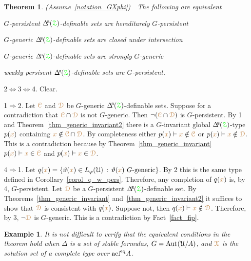 \documentclass[10pt,openany]{amsproc}
\makeatletter
\newcommand{\mylabel}[1]{{\ssf{#1}}\hfill}
\renewenvironment{itemize}
  {\begin{list}{}{%
   \setlength{\parskip}{0mm}
   \setlength{\topsep}{.2\baselineskip}
   \setlength{\rightmargin}{0mm}
   \setlength{\listparindent}{0mm}
   \setlength{\itemindent}{0mm}
   \setlength{\labelwidth}{2ex}
   \setlength{\itemsep}{.1\baselineskip}
   \setlength{\parsep}{0mm}
   \setlength{\partopsep}{0mm}
   \setlength{\labelsep}{1ex}
   \setlength{\leftmargin}{\labelwidth+\labelsep}
   \let\makelabel\mylabel
   }}
   {\vspace*{-.3\baselineskip}\end{list}}
\def\proves{\vdash}
\def\acl{\mathop{\rm acl}}
\def\eq{{{\rm eq}}}
\def\Aut{{\rm Aut\kern.15ex}}
\def\BDelta{\smash{\Delta\hskip-.4ex\raisebox{.8ex}{\tiny\sf B}}}
\def\IMP{\Rightarrow}
\def\IFF{\Leftrightarrow}
\def\D{\EuScript D}
\def\X{\EuScript X}
\def\Z{\EuScript Z}
\def\C{\EuScript C}
\def\U{\EuScript U}
\def\theta{\vartheta}
\def\phi{\varphi}
\def\ssf#1{\textsf{\small #1}}
\newcounter{thm}
\theoremstyle{mio}
\newtheorem{theorem}[thm]{Theorem}\tcolorboxenvironment{theorem}{mythm}
\newtheorem{example}[thm]{Example}\tcolorboxenvironment{example}{mythm}
\providecommand{\proofNameStyle}{\bfseries}
\renewenvironment{proof}[1][\proofname]{\par
  \pushQED{\qed}%
  \normalfont%
  \trivlist
  \item[\hskip\labelsep
        \proofNameStyle
    #1\@addpunct{.}]\ignorespaces
}{%
  \popQED\endtrivlist\@endpefalse
}
\def\mr{\color{brown}}
\def\gr{\color{green}}
\def\mrC{{\mr\C}}
\def\mrD{{\mr\D}}
\def\mrX{{\mr\X}}
\def\grZ{{\gr\Z}}
\makeatother
\begin{document}
\begin{theorem}\label{thm_coalesce}
  (Assume~\ref{notation_GXphi})\ \ 
  The following are equivalent
  \begin{itemize}
    \item[1.] $G$-persistent $\BDelta({\grZ})$-definable sets are hereditarely $G$-persistent
    \item[2.] $G$-generic $\BDelta({\grZ})$-definable sets are closed under intersection
    \item[3.] $G$-generic $\BDelta({\grZ})$-definable sets are strongly $G$-generic
    \item[4.] weakly persisent $\BDelta({\grZ})$-definable sets are $G$-persistent.
  \end{itemize}
\end{theorem}

\begin{proof}
  \ssf2$\IFF$\ssf3$\IFF$\ssf4. Clear.

  \ssf1$\IMP$\ssf2.
  Let $\mrC$ and $\mrD$ be $G$-generic $\BDelta({\grZ})$-definable sets.
  Suppose for a contradiction that $\mrC\cap\mrD$ is not $G$-generic.
  Then $\neg(\mrC\cap\mrD)$ is $G$-persistent.
  By \ssf1 and Theorem~\ref{thm_generic_invariant2} there is a $G$-invariant global $\BDelta({\grZ})$-type $p({\mr x})$ containing ${\mr x}\notin\mrC\cap\mrD$.
  By completeness either $p({\mr x})\proves{\mr x}\notin\mrC$ or $p({\mr x})\proves{\mr x}\notin\mrD$.
  This is a contradiction because by Theorem~\ref{thm_generic_invariant} $p({\mr x})\proves{\mr x}\in\mrC$ and $p({\mr x})\proves{\mr x}\in\mrD$.

  \ssf4$\IMP$\ssf1.
  Let $q({\mr x})=\{\theta({\mr x})\in L_\phi(\U)\,:\,\theta({\mr x})\textrm{ $G$-generic}\}$.
  By \ssf2 this is the same type defined in Corollary~\ref{corol_q_w_pers}.
  Therefore, any completion of $q({\mr x})$ is, by \ssf4, $G$-persistent.
  Let $\mrD$ be a $G$-persistent $\BDelta({\grZ})$-definable set.
  By Theorems~\ref{thm_generic_invariant} and~\ref{thm_generic_invariant2} it suffices to show that $\mrD$ is consistent with $q({\mr x})$.
  Suppose not, then $q({\mr x})\proves {\mr x}\notin\mrD$.
  Therefore, by \ssf3, $\neg\mrD$ is $G$-generic.
  This is a contradiction by Fact~\ref{fact_fip}.
\end{proof}

\begin{example}
  It is not difficult to verify that the equivalent conditions in the theorem hold when $\Delta$ is a set of stable formulas, $G=\Aut(\U/A)$, and $\mrX$ is the solution set of a complete type over $\acl^\eq\!A$.
\end{example}
\end{document}
